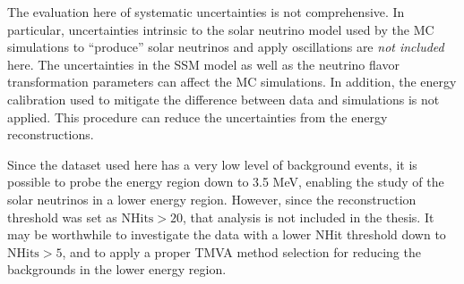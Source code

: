 The evaluation here of systematic uncertainties is not comprehensive. In particular, uncertainties intrinsic to the solar neutrino model used by the MC simulations to ``produce'' solar neutrinos and apply oscillations are {\em not included} here. The uncertainties in the SSM model as well as the neutrino flavor transformation parameters can affect the MC simulations. In addition, the energy calibration used to mitigate the difference between data and simulations is not applied. This procedure can reduce the uncertainties from the energy reconstructions. 

Since the dataset used here has a very low level of background events, it is possible to probe the energy region down to 3.5 MeV, enabling the study of the solar neutrinos in a lower energy region. However, since the reconstruction threshold was set as $\mathrm{NHits}>20$, that analysis is not included in the thesis. It may be worthwhile to investigate the data with a lower NHit threshold down to $\mathrm{NHits}>5$, and to apply a proper TMVA method selection for reducing the backgrounds in the lower energy region.